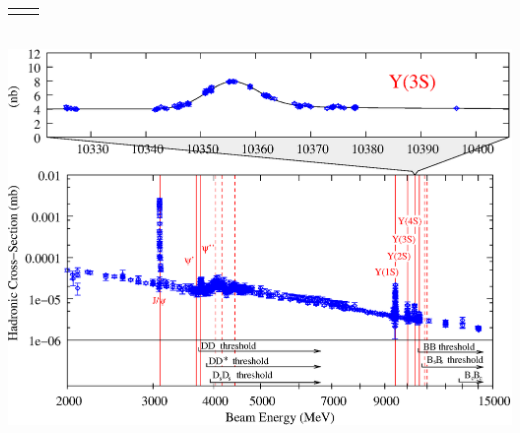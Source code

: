 \begin{slide*}
\begin{minipage}[t]{\linewidth}
\begin{center}
\begin{tabular}{p{0.45\linewidth} p{0.45\linewidth}}
\begin{minipage}{\linewidth}
\begin{center}
      \end{center}
    \end{minipage} \\
  \end{tabular} \\
  \vspace{0.3 cm}
  \includegraphics[width=0.85\linewidth]{qqbar_rescont.eps}
\end{center}

\end{minipage}
\end{slide*}



